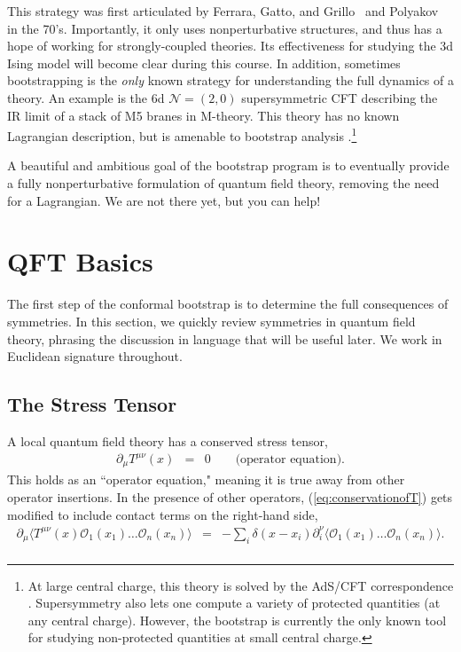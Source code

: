 \documentclass{ws-rv9x6}
\newcommand\be{\begin{eqnarray}}
\newcommand\ee{\end{eqnarray}}
\newcommand\cO{\mathcal{O}}
\newcommand\ptl\partial
\newcommand\<\langle
\renewcommand\>\rangle
\newcommand\de\delta
\newcommand\nn{\nonumber}
\renewcommand\.{\cdot}
\begin{document}
This strategy was first articulated by Ferrara, Gatto, and Grillo~\cite{Ferrara:1973yt} and Polyakov~\cite{Polyakov:1974gs} in the 70's.  Importantly, it only uses nonperturbative structures, and thus has a hope of working for strongly-coupled theories.  Its effectiveness for studying the 3d Ising model will become clear during this course.  In addition, sometimes bootstrapping is the {\it only\/} known strategy for understanding the full dynamics of a theory. An example is the 6d $\mathcal{N}=(2,0)$ supersymmetric CFT describing the IR limit of a stack of M5 branes in M-theory.  This theory has no known Lagrangian description, but is amenable to bootstrap analysis \cite{Beem:2015aoa}.\footnote{At large central charge, this theory is solved by the AdS/CFT correspondence \cite{Maldacena:1997re}. Supersymmetry also lets one compute a variety of protected quantities (at any central charge).  However, the bootstrap is currently the only known tool for studying non-protected quantities at small central charge.}

A beautiful and ambitious goal of the bootstrap program is to eventually provide a fully nonperturbative  formulation of quantum field theory, removing the need for a Lagrangian.  We are not there yet, but you can help!


\section{QFT Basics}

The first step of the conformal bootstrap is to determine the full consequences of symmetries.  In this section, we quickly review symmetries in quantum field theory, phrasing the discussion in language that will be useful later.  We work in Euclidean signature throughout.

\subsection{The Stress Tensor}

A local quantum field theory has a conserved stress tensor,
\be
\label{eq:conservationofT}
\ptl_\mu T^{\mu\nu}(x) &=& 0 \qquad \textrm{(operator equation)}.
\ee
This holds as an ``operator equation," meaning it is true away from other operator insertions.  In the presence of other operators, (\ref{eq:conservationofT}) gets modified to include contact terms on the right-hand side,
\be
\label{eq:wardidentity}
\partial_\mu \< T^{\mu\nu}(x) \cO_1(x_1)\dots \cO_n(x_n)\> &=& -\sum_i \de(x-x_i)\ptl_i^\nu\<\cO_1(x_1)\dots \cO_n(x_n)\>.\nn\\
\ee
\end{document}
